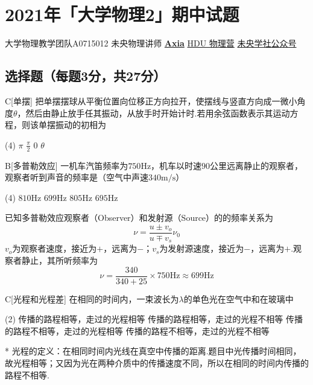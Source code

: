 \chapter{2021年「大学物理2」期中试题}
\date{2021年11月20日}{大学物理教学团队}{A0715012}
{未央物理讲师 \href{https://qm.qq.com/q/UPbGudx8cK}{\textbf{Axia}}}
{}{\href{https://qm.qq.com/q/asJiytD5pC}{HDU 物理营}}
{}{\href{http://weixin.qq.com/r/mhKYgFTEMQlOrRDj90eI}{未央学社公众号}}

\section{选择题（每题3分，共27分）}
\begin{choice}{C}[单摆]
    把单摆摆球从平衡位置向位移正方向拉开，使摆线与竖直方向成一微小角度$\theta$，然后由静止放手任其振动，从放手时开始计时.若用余弦函数表示其运动方程，则该单摆振动的初相为
    \begin{tasks}(4)
        \task $\pi$
        \task $\frac{\pi}{2}$
        \task $0$
        \task $\theta$
    \end{tasks}
\end{choice}

\begin{choice}{B}[多普勒效应]
    一机车汽笛频率为$750\mathrm{Hz}$，机车以时速$90$公里远离静止的观察者，观察者听到声音的频率是（空气中声速$340\mathrm{m/s}$）
    \begin{tasks}(4)
        \task $810\mathrm{Hz}$
        \task $699\mathrm{Hz}$
        \task $805\mathrm{Hz}$
        \task $695\mathrm{Hz}$
    \end{tasks}
\end{choice}
\begin{solution}
    已知多普勒效应观察者（Observer）和发射源（Source）的的频率关系为
    \[\nu=\frac{u\pm v_o}{u\mp v_s}\nu_0\]
    \color{solutioncolor}
    $v_o$为观察者速度，接近为$+$，远离为$-$；$v_s$为发射源速度，接近为$-$，远离为$+$.观察者静止，其所听频率为
    \[\nu=\frac{340}{340+25}\times 750\mathrm{Hz}\approx 699\mathrm{Hz}\]
    
\end{solution}

\begin{choice}{C}[光程和光程差]
    在相同的时间内，一束波长为$\lambda$的单色光在空气中和在玻璃中
    \begin{tasks}(2)
        \task 传播的路程相等，走过的光程相等
        \task 传播的路程相等，走过的光程不相等
        \task 传播的路程不相等，走过的光程相等
        \task 传播的路程不相等，走过的光程不相等
    \end{tasks}
\end{choice}
\begin{solution}*
    光程的定义：在相同时间内光线在真空中传播的距离.题目中光传播时间相同，故光程相等；又因为光在两种介质中的传播速度不同，所以在相同的时间内传播的路程不相等.
\end{solution}

